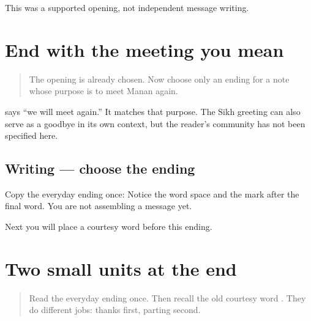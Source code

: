\begin{tcolorbox}[breakable,colback=teal!4,colframe=teal!35!black,title={Before you move on}]
This was a supported opening, not independent message writing.
\end{tcolorbox}
\section[\texorpdfstring{\pa{ਫਿਰ} \pa{ਮਿਲਾਂਗੇ} (phir milāṁge)}{ਫਿਰ ਮਿਲਾਂਗੇ (phir milāṁge)}]{End with the meeting you mean}

\label{lesson:PA-W12-closing-choice}



\begin{quote}
The opening is already chosen. Now choose only an ending for a note whose purpose is to meet Manan again.
\end{quote}

\begin{culture}
\textbf{ } says “we will meet again.” It matches that purpose. The Sikh greeting \textbf{  } can also serve as a goodbye in its own context, but the reader's community has not been specified here.
\end{culture}

\subsection*{Writing — choose the ending}
Copy the everyday ending once: \textbf{ } Notice the word space and the mark after the final word. You are not assembling a message yet.

\begin{tcolorbox}[breakable,colback=teal!4,colframe=teal!35!black,title={Before you move on}]
Next you will place a courtesy word before this ending.
\end{tcolorbox}
\section[\texorpdfstring{\pa{ਧੰਨਵਾਦ।} \pa{ਫਿਰ} \pa{ਮਿਲਾਂਗੇ।} (dhanvād · phir …)}{ਧੰਨਵਾਦ। ਫਿਰ ਮਿਲਾਂਗੇ। (dhanvād · phir …)}]{Two small units at the end}

\label{lesson:PA-W12-closing-supported}



\begin{quote}
Read the everyday ending once. Then recall the old courtesy word \textbf{}. They do different jobs: thanks first, parting second.
\end{quote}

